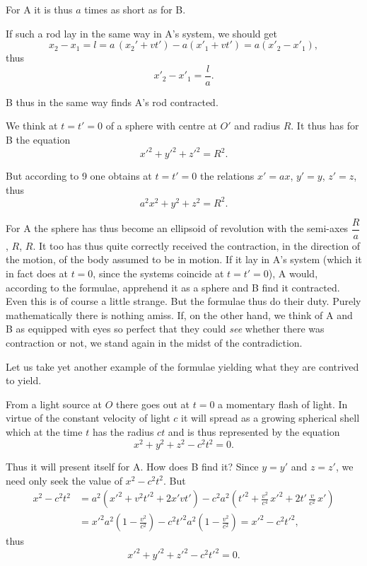 \documentclass[12pt,a4paper]{article}
\begin{document}
For A it is thus $a$ times as short as for B.

If such a rod lay in the same way in A's system, we should get
\[
  x_{2} - x_{1} = l = a\,(x_{2}{}' + vt') - a(x'_{1} + vt')
    = a(x'_{2} - x'_{1}),
\]
thus
\[
  x'_{2} - x'_{1} = \frac{l}{a}.
\]

B thus in the same way finds A's rod contracted.

We think at $t = t' = 0$ of a sphere with centre at $O'$ and radius $R$. It
thus has for B the equation
\[
  {x'}^{2} + {y'}^{2} + {z'}^{2} = R^{2}.
\]

But according to 9 one obtains at $t = t' = 0$ the relations $x' = ax$,
$y' = y$, $z' = z$, thus
\[
  a^{2}x^{2} + y^{2} + z^{2} = R^{2}.
\]

For A the sphere has thus become an ellipsoid of revolution with the
semi-axes $\dfrac{R}{a}$, $R$, $R$. It too has thus quite correctly received
the contraction, in the direction of the motion, of the body assumed to be in
motion. If it lay in A's system (which it in fact does at $t = 0$, since the
systems coincide at $t = t' = 0$), A would, according to the formulae,
apprehend it as a sphere and B find it contracted. Even this is of course a
little strange. But the formulae thus do their duty. Purely mathematically
there is nothing amiss. If, on the other hand, we think of A and B as equipped
with eyes so perfect that they could \emph{see} whether there was contraction
or not, we stand again in the midst of the contradiction.

Let us take yet another example of the formulae yielding what they are
contrived to yield.

From a light source at $O$ there goes out at $t = 0$ a momentary flash of
light. In virtue of the constant velocity of light $c$ it will spread as a
growing spherical shell which at the time $t$ has the radius $ct$ and is thus
represented by the equation
\[
  x^{2} + y^{2} + z^{2} - c^{2}t^{2} = 0.
\]

Thus it will present itself for A. How does B find it? Since $y = y'$ and
$z = z'$, we need only seek the value of $x^{2} - c^{2}t^{2}$. But
\begin{align*}
  x^{2} - c^{2}t^{2}
    &= a^{2}({x'}^{2} + v^{2}{t'}^{2} + 2x'vt')
     - c^{2}a^{2}\left({t'}^{2} + \tfrac{v^{2}}{c^{4}}\,{x'}^{2}
       + 2t'\,\tfrac{v}{c^{2}}\,x'\right)\\
    &= {x'}^{2}a^{2}\left(1 - \frac{v^{2}}{c^{2}}\right)
     - c^{2}{t'}^{2}a^{2}\left(1 - \frac{v^{2}}{c^{2}}\right)
     = {x'}^{2} - c^{2}{t'}^{2},
\end{align*}
thus
\[
  {x'}^{2} + {y'}^{2} + {z'}^{2} - c^{2}{t'}^{2} = 0.
\]
\end{document}
